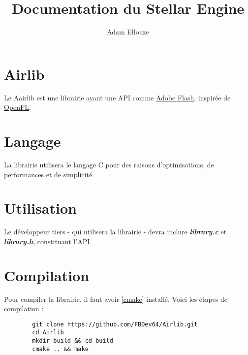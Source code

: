 \documentclass{article}
\title{Documentation du Stellar Engine}
\author{Adam Ellouze}
\numberwithin{equation}{section}    %
\begin{document}

\maketitle

\section{Airlib}
    Le Aairlib est une librairie ayant une API comme \href{https://en.wikipedia.org/wiki/Adobe_Flash_Player}{Adobe Flash}, inspirée de \href{https://www.openfl.org/}{OpenFL}.\vspace{1cm}

\section{Langage}
La librairie utilisera le langage C pour des raisons d'optimisations, de performances et de simplicité.

\section{Utilisation}
    Le développeur tiers - qui utilisera la librairie - devra inclure \textit{\textbf{library.c}}  et \textit{\textbf{library.h}}, constituant l'API.

    

\section{Compilation}
    Pour compiler la librairie, il faut avoir \ref{cmake} installé. Voici les étapes de compilation : \vspace{0.5cm}

    \begin{lstlisting}
        git clone https://github.com/FBDev64/Airlib.git
        cd Airlib
        mkdir build && cd build
        cmake .. && make
    \end{lstlisting}
    \vspace{0.5cm}
\end{document}

